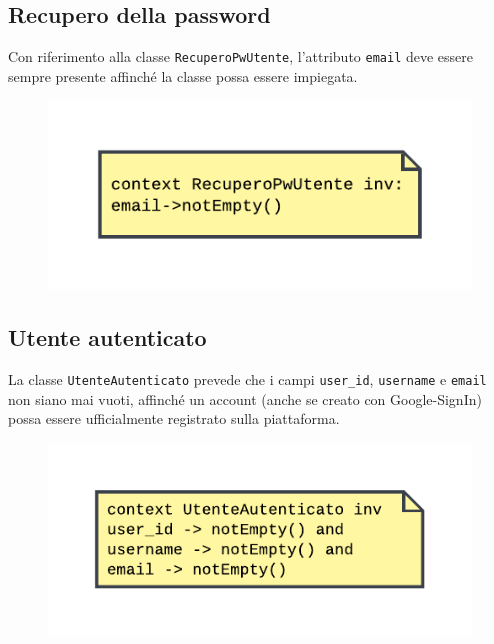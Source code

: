\documentclass[11pt, a4paper]{article}
\theoremstyle{definition} %
\begin{document}
\subsection{Recupero della password}
Con riferimento alla classe \texttt{RecuperoPwUtente},
l'attributo \texttt{email} deve essere sempre presente affinché la classe
possa essere impiegata.
\begin{figure}[H]
\centering
\includegraphics[scale = 1]{materiale/ocl-recuperoemail.pdf}
\end{figure}

\subsection{Utente autenticato}
La classe \texttt{UtenteAutenticato} prevede che i campi \texttt{user\_id},
\texttt{username} e \texttt{email} non siano mai vuoti, affinché un
account (anche se creato con Google-SignIn) possa essere ufficialmente registrato
sulla piattaforma.

\begin{figure}[H]
\centering
\includegraphics[scale = 0.9]{materiale/ocl-utenteautenticato.pdf}
\end{figure}
\end{document}
